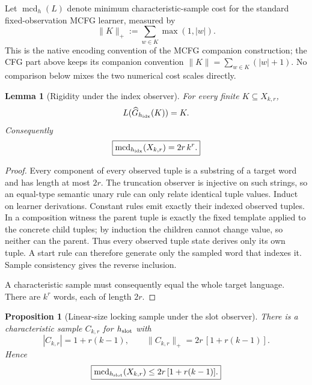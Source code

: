 \documentclass[11pt]{article}
\newtheorem{lemma}[definition]{Lemma}
\newtheorem{proposition}[definition]{Proposition}
\begin{document}
Let $\operatorname{mcd}_h(L)$ denote minimum characteristic-sample cost for
the standard fixed-observation MCFG learner, measured by
\[
  \|K\|_+:=\sum_{w\in K}\max(1,|w|).
\]
This is the native encoding convention of the MCFG companion construction;
the CFG part above keeps its companion convention
$\|K\|=\sum_{w\in K}(|w|+1)$.  No comparison below mixes the two numerical
cost scales directly.

\begin{lemma}[Rigidity under the index observer]
\label{lem:index-rigidity}
For every finite $K\subseteq X_{k,r}$,
\[
  L(\widehat G_{h_{\rm idx}}(K))=K.
\]
Consequently
\[
  \boxed{
  \operatorname{mcd}_{h_{\rm idx}}(X_{k,r})=2r\,k^r.
  }
\]
\end{lemma}

\begin{proof}
Every component of every observed tuple is a substring of a target word and
has length at most $2r$.  The truncation observer is injective on such strings,
so an equal-type semantic unary rule can only relate identical tuple values.
Induct on learner derivations.  Constant rules emit exactly their indexed
observed tuples.  In a composition witness the parent tuple is
exactly the fixed template applied to the concrete child tuples; by induction
the children cannot change value, so neither can the parent.  Thus every
observed tuple state derives only its own tuple.  A start rule can therefore
generate only the sampled word that indexes it.  Sample consistency gives the
reverse inclusion.

A characteristic sample must consequently equal the whole target language.
There are $k^r$ words, each of length $2r$.
\end{proof}

\begin{proposition}[Linear-size locking sample under the slot observer]
\label{prop:slot-upper}
There is a characteristic sample $C_{k,r}$ for $h_{\rm slot}$ with
\[
  |C_{k,r}|=1+r(k-1),
  \qquad
  \|C_{k,r}\|_+=2r\,[1+r(k-1)].
\]
Hence
\[
 \boxed{
  \operatorname{mcd}_{h_{\rm slot}}(X_{k,r})
  \le 2r\,[1+r(k-1)].
 }
\]
\end{proposition}
\end{document}
